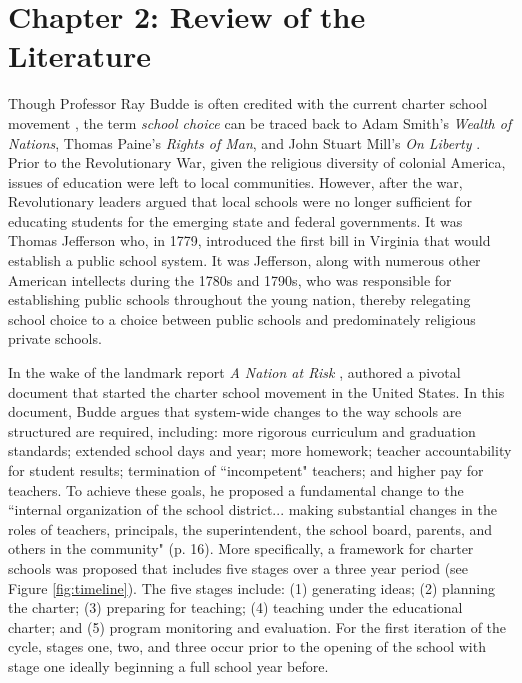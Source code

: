 \documentclass[letterpaper,12pt]{article} %
\begin{document}
\cleardoublepage
\section{Chapter 2: Review of the Literature}

Though Professor Ray Budde is often credited with the current charter school movement \cite{Kolderie2005}, the term \textit{school choice} can be traced back to Adam Smith's \textit{Wealth of Nations}, Thomas Paine's \textit{Rights of Man}, and John Stuart Mill's \textit{On Liberty} \cite{herbst2006}. Prior to the Revolutionary War, given the religious diversity of colonial America, issues of education were left to local communities. However, after the war, Revolutionary leaders argued that local schools were no longer sufficient for educating students for the emerging state and federal governments. It was Thomas Jefferson who, in 1779, introduced the first bill in Virginia that would establish a public school system. It was Jefferson, along with numerous other American intellects during the 1780s and 1790s, who was responsible for establishing public schools throughout the young nation, thereby relegating school choice to a choice between public schools and predominately religious private schools.

In the wake of the landmark report \textit{A Nation at Risk} \cite{nationatrisk},  authored a pivotal document that started the charter school movement in the United States. In this document, Budde argues that system-wide changes to the way schools are structured are required, including: more rigorous curriculum and graduation standards; extended school days and year; more homework; teacher accountability for student results; termination of ``incompetent" teachers; and higher pay for teachers. To achieve these goals, he proposed a fundamental change to the ``internal organization of the school district... making substantial changes in the roles of teachers, principals, the superintendent, the school board, parents, and others in the community" (p. 16). More specifically, a framework for charter schools was proposed that includes five stages over a three year period (see Figure \ref{fig:timeline}). The five stages include: (1) generating ideas; (2) planning the charter; (3) preparing for teaching; (4) teaching under the educational charter; and (5) program monitoring and evaluation. For the first iteration of the cycle, stages one, two, and three occur prior to the opening of the school with stage one ideally beginning a full school year before. 
\end{document}
